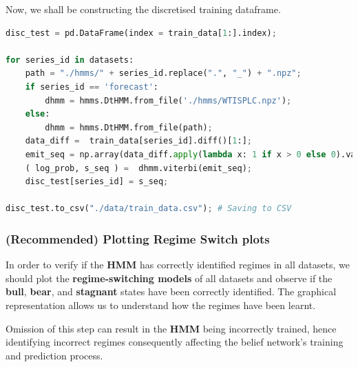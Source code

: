 Now, we shall be constructing the discretised training dataframe.

\begin{lstlisting}[language=Python]
disc_test = pd.DataFrame(index = train_data[1:].index);

for series_id in datasets:
    path = "./hmms/" + series_id.replace(".", "_") + ".npz";
    if series_id == 'forecast':
        dhmm = hmms.DtHMM.from_file('./hmms/WTISPLC.npz');
    else:
        dhmm = hmms.DtHMM.from_file(path);
    data_diff =  train_data[series_id].diff()[1:];
    emit_seq = np.array(data_diff.apply(lambda x: 1 if x > 0 else 0).values);
    ( log_prob, s_seq ) =  dhmm.viterbi(emit_seq);
    disc_test[series_id] = s_seq;

disc_test.to_csv("./data/train_data.csv"); # Saving to CSV
\end{lstlisting}

\hypertarget{recommended-plotting-regime-switch-plots}{%
\subsubsection{(Recommended) Plotting Regime Switch
plots}\label{recommended-plotting-regime-switch-plots}}

In order to verify if the \textbf{HMM} has correctly identified regimes
in all datasets, we should plot the \textbf{regime-switching models} of
all datasets and observe if the \textbf{bull}, \textbf{bear}, and
\textbf{stagnant} states have been correctly identified. The graphical
representation allows us to understand how the regimes have been learnt.

Omission of this step can result in the \textbf{HMM} being incorrectly
trained, hence identifying incorrect regimes consequently affecting the
belief network's training and prediction process.

